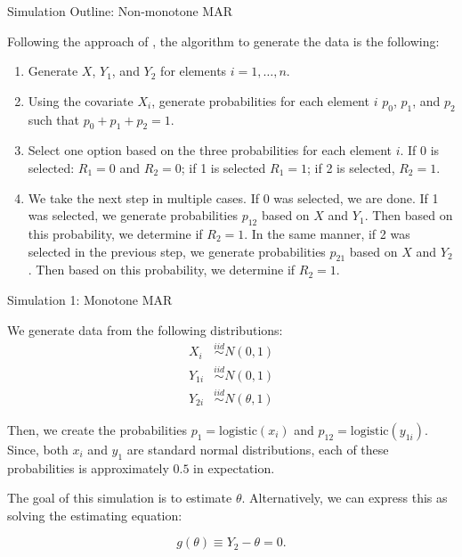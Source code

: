 \documentclass{beamer} %
\newcommand{\logistic}{{\text{logistic}}}
\begin{document}
\begin{frame}{Simulation Outline: Non-monotone MAR}

    Following the approach of \cite{robins1997non},
    the algorithm to generate the data is the following:
    \begin{enumerate}
        \item Generate $X$, $Y_1$, and $Y_2$ for elements $i = 1, \dots, n$.
        \item Using the covariate $X_i$, generate probabilities for each element
          $i$ $p_0$, $p_1$, and $p_2$ such that $p_0 + p_1 + p_2 = 1$. 
        \item Select one option based on the three probabilities for each
          element $i$. If 0 is selected: $R_1 = 0$ and $R_2 = 0$; if 1 is
          selected $R_1 = 1$; if 2 is selected, $R_2 = 1$.
        \item We take the next step in multiple cases. If 0 was selected, we are
          done. If 1 was selected, we generate probabilities $p_{12}$ based on
          $X$ and $Y_1$. Then based on this probability, we determine if $R_2 =
          1$. In the same manner, if 2 was selected in the previous step, we
          generate probabilities $p_{21}$ based on $X$ and $Y_2$. Then based on
          this probability, we determine if $R_2 = 1$.
    \end{enumerate}
\end{frame}

\begin{frame}{Simulation 1: Monotone MAR}

    
    We generate data from the following distributions:
    \begin{align*}
        X_i &\stackrel{iid}{\sim} N(0, 1) \\
        Y_{1i} &\stackrel{iid}{\sim} N(0, 1)\\
        Y_{2i} &\stackrel{iid}{\sim} N(\theta, 1)
    \end{align*}

    Then, we create the probabilities $p_1 = \logistic(x_i)$ and 
    $p_{12} = \logistic(y_{1i})$.
    Since, both $x_i$ and $y_1$ are standard normal distributions, each of these
    probabilities is approximately $0.5$ in expectation.

    The goal of this simulation is to estimate $\theta$. Alternatively, we can
    express this as solving the estimating equation:

    \[g(\theta) \equiv Y_2 - \theta = 0.\]

\end{frame}
\end{document}
